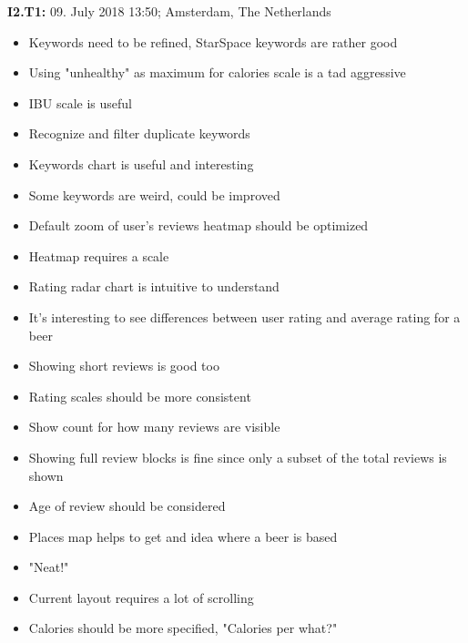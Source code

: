 \hfill

\begin{flushleft}
    \textbf{I2.T1:} 09. July 2018 13:50; Amsterdam, The Netherlands
    \begin{itemize}
        \item Keywords need to be refined, StarSpace keywords are rather good
        \item Using "unhealthy" as maximum for calories scale is a tad aggressive
        \item IBU scale is useful
        \item Recognize and filter duplicate keywords
        \item Keywords chart is useful and interesting
        \item Some keywords are weird, could be improved
        \item Default zoom of user's reviews heatmap should be optimized
        \item Heatmap requires a scale
        \item Rating radar chart is intuitive to understand
        \item It's interesting to see differences between user rating and average rating for a beer
        \item Showing short reviews is good too
        \item Rating scales should be more consistent
        \item Show count for how many reviews are visible
        \item Showing full review blocks is fine since only a subset of the total reviews is shown
        \item Age of review should be considered
        \item Places map helps to get and idea where a beer is based
        \item "Neat!"
        \item Current layout requires a lot of scrolling
        \item Calories should be more specified, "Calories per what?"
    \end{itemize}
\end{flushleft}

\hfill

